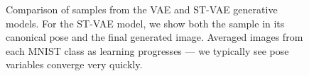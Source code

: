 \label{sec:eval}

\begin{figure}[t]
\begin{center}
\qquad
{}\vspace{-3mm}
\end{center}
 \caption{\footnotesize
  Comparison of samples from the VAE and ST-VAE generative models.  
 For the ST-VAE model, we show both the sample in its canonical pose and the final generated image.
    Averaged images from each MNIST class as learning progresses ---
  we typically see pose variables converge very quickly.
 }
\end{figure}



